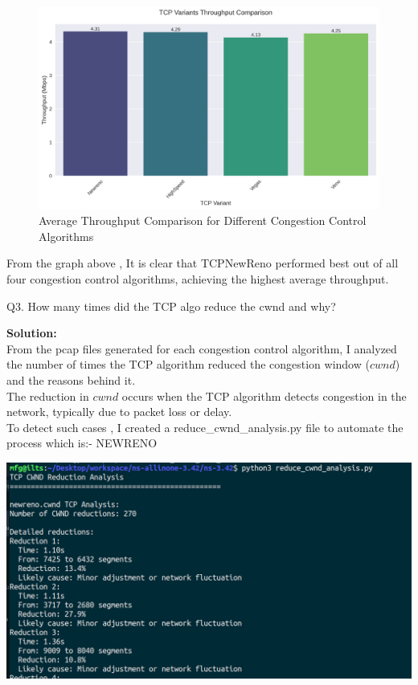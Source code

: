 \documentclass[11pt,a4paper]{article}
\begin{document}
\begin{figure}[h]
    \centering
    \includegraphics[width=0.9\columnwidth]{images/thorughput_graph.jpg}
    \caption{Average Throughput Comparison for Different Congestion Control Algorithms}
\end{figure}

From the graph above , It is clear that TCPNewReno performed best out of all four congestion control algorithms, achieving the highest average throughput.


\begin{tcolorbox}[colback=boxbg, colframe=boxborder, title=Question-2]
    Q3. How many times did the TCP algo reduce the cwnd and why?
\end{tcolorbox}

\Large{\textbf{Solution:}}\\
From the pcap files generated for each congestion control algorithm, I analyzed the number of times the TCP algorithm reduced the congestion window ($cwnd$) and the reasons behind it.\\
The reduction in $cwnd$ occurs when the TCP algorithm detects congestion in the network, typically due to packet loss or delay.\\
To detect such cases , I created a reduce\_cwnd\_analysis.py file to automate the process which is:-
\large{\textcolor{brightblue}{NEWRENO}}

\begin{center}
    \includegraphics[width=1\columnwidth]{images/reduce_cwnd1.jpg}
\end{center}
\end{document}
